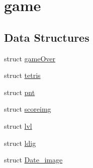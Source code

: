 \hypertarget{group__game}{}\section{game}
\label{group__game}
\subsection*{Data Structures}
\begin{DoxyCompactItemize}
\item 
struct \mbox{\hyperlink{structgame_over}{game\+Over}}
\item 
struct \mbox{\hyperlink{structtetris}{tetris}}
\item 
struct \mbox{\hyperlink{structpnt}{pnt}}
\item 
struct \mbox{\hyperlink{structscoreimg}{scoreimg}}
\item 
struct \mbox{\hyperlink{structlvl}{lvl}}
\item 
struct \mbox{\hyperlink{structldig}{ldig}}
\item 
struct \mbox{\hyperlink{struct_date__image}{Date\+\_\+image}}
\end{DoxyCompactItemize}
